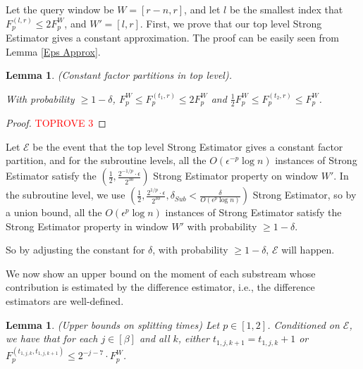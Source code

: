 \documentclass{article}
\newcommand{\est}{\textsf{Strong Estimator }}
\newcommand{\estt}{\textsf{Strong Estimator}}
\theoremstyle{plain}
\newtheorem{lem}[theorem]{Lemma}
\begin{document}
Let the query window be $W=[r-n,r]$, and let $l$ be the smallest index that $F_p ^ {(l,r)} \le 2 F_p ^ W$, and $W'=[l,r]$. First, we prove that our top level \est gives a constant approximation. The proof can be easily seen from Lemma \ref{Eps Approx}. 

\begin{lem}\label{A.1}
 (Constant factor partitions in top level). 

With probability $\ge 1 - \delta$, $F_p ^ W \leq F_p ^ {\left(t_1, r\right)} \leq 2 F_p ^ W$ and $\frac{1}{2} F_p ^ W \leq F_p ^ {\left(t_{2}, r\right)} \leq F_p ^ W$.

\end{lem}

\begin{proof}\textcolor{red}{TOPROVE 3}\end{proof}


Let $\mathcal{E}$ be the event that the top level \est gives a constant factor partition, and for the subroutine levels, all the $O(\epsilon ^ {-p} \log n)$ instances of \est satisfy the $(\frac 12, \frac {2 ^ {-1/p}\cdot \epsilon}{2 ^ {30}})$ \est property on window $W'$. In the subroutine level, we use $(\frac 12, \frac {2 ^ {1/p} \cdot \epsilon}{2 ^ {30}}, \delta_{Sub}< \frac {\delta}{O(\epsilon ^ p \log n)})$ \estt, so by a union bound, all the $O(\epsilon ^ p \log n)$ instances of \est satisfy the \est property in window $W'$ with probability $\ge 1 - \delta$. 

So by adjusting the constant for  $\delta$, with probability $\ge 1 - \delta$, $\mathcal{E}$ will happen.


We now show an upper bound on the moment of each substream whose contribution is estimated by the difference estimator, i.e., the difference estimators are well-defined.


\begin{lem}\label{A.2}(Upper bounds on splitting times)
    Let $p \in[1,2]$. Conditioned on $\mathcal{E}$, we have that for each $j \in[\beta]$ and all $k$, either $t_{1, j, k+1}=t_{1, j, k}+1$ or $F_p ^ {\left(t_{1, j, k}, t_{1, j, k+1}\right)} \leq 2^{-j-7} \cdot F_p ^ W$.
\end{lem}
\end{document}
